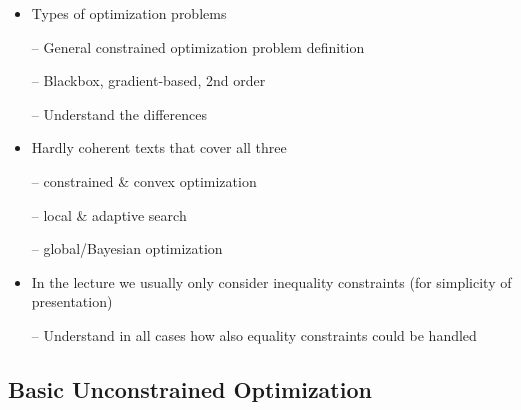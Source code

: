 \begin{itemize}
\item Types of optimization problems

-- General constrained optimization problem definition

-- Blackbox, gradient-based, 2nd order

-- Understand the differences

\item Hardly coherent texts that cover all three

-- constrained \& convex optimization

-- local \& adaptive search

-- global/Bayesian optimization

\item In the lecture we usually only consider inequality constraints
  (for simplicity of presentation)

-- Understand in all cases how also equality constraints could be
handled
\end{itemize}


\subsection{Basic Unconstrained Optimization}

